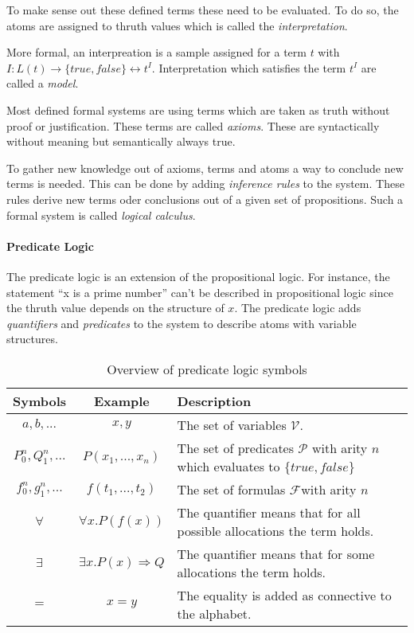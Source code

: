 To make sense out these defined terms these need to be evaluated. To do so,
the atoms are assigned to thruth values which is called the \textit{interpretation}.~\cite{tuschik1994mathematische}

\begin{defi}
  More formal, an interpreation is a sample assigned for a term $t$ with
  $I:L(t)\rightarrow \{true,false\} \leftrightarrow t^I$. Interpretation which satisfies the term
  $t^I$ are called a \textit{model}.
\end{defi}

Most defined formal systems are using terms which are taken as truth without
proof or justification. These terms are called \textit{axioms}. These are syntactically
without meaning but semantically always true.~\cite{tuschik1994mathematische}

To gather new knowledge out of axioms, terms and atoms a way to conclude
new terms is needed. This can be done by adding \textit{inference rules} to
the system. These rules derive new terms oder conclusions out of a given
set of propositions. Such a formal system is called \textit{logical calculus}.~\cite{tuschik1994mathematische}

\paragraph{Predicate Logic}
The predicate logic is an extension of the propositional logic.
For instance, the statement ``x is a prime number'' can't be described
in propositional logic since the thruth value depends on the structure of $x$.
The predicate logic adds \textit{quantifiers} and \textit{predicates} to the
system to describe atoms with variable structures.~\cite{heinemann2013logik}

\begin{table}[h]
  \centering
  \begin{tabular}{c|c|l}
    Symbols & Example & Description\\\hline
    $a,b,...$ & $x,y$ & The set of variables $\mathcal{V}$.\\
    $P_0^n,Q_1^n,...$ & $P(x_1,...,x_n)$ & The set of predicates $\mathcal{P}$ with arity $n$
                                          which evaluates to $\{true,false\}$\\
    $f_0^n,g_1^n,...$ & $f(t_1,...,t_2)$ & The set of formulas $\mathcal{F}$with arity $n$\\
    $\forall$ & $\forall x.P(f(x))$ & The quantifier means that for all possible allocations the term holds.\\
    $\exists$ & $\exists x.P(x)\Rightarrow Q$ & The quantifier means that for some allocations the term holds.\\
    $=$ & $x = y$ & The equality is added as connective to the alphabet.\\
  \end{tabular}
  \caption{Overview of predicate logic symbols}
  \label{tab:predlogic}
\end{table}

